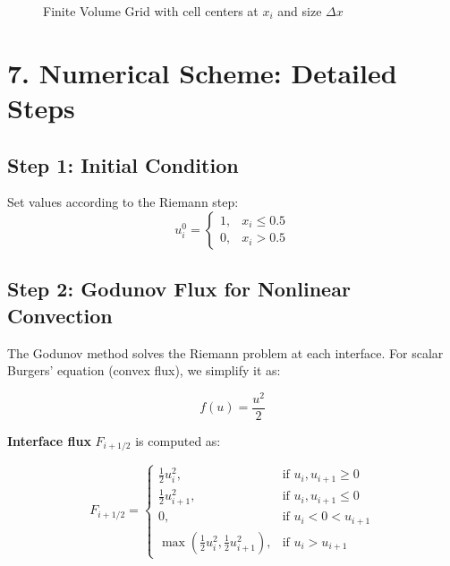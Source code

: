 \documentclass[12pt]{article}
\begin{document}
\begin{figure}[H]
\centering
{}
\caption{Finite Volume Grid with cell centers at $x_i$ and size $\Delta x$}
\end{figure}

\section*{7. Numerical Scheme: Detailed Steps}

\subsection*{Step 1: Initial Condition}
Set values according to the Riemann step:
\[
u^0_i =
\begin{cases}
1, & x_i \leq 0.5 \\
0, & x_i > 0.5
\end{cases}
\]

\subsection*{Step 2: Godunov Flux for Nonlinear Convection}
The Godunov method solves the Riemann problem at each interface. For scalar Burgers' equation (convex flux), we simplify it as:

\[
f(u) = \frac{u^2}{2}
\]

\textbf{Interface flux} \( F_{i+1/2} \) is computed as:

\[
F_{i+1/2} = 
\begin{cases}
\frac{1}{2} u_i^2, & \text{if } u_i, u_{i+1} \geq 0 \\
\frac{1}{2} u_{i+1}^2, & \text{if } u_i, u_{i+1} \leq 0 \\
0, & \text{if } u_i < 0 < u_{i+1} \\
\max\left( \frac{1}{2} u_i^2, \frac{1}{2} u_{i+1}^2 \right), & \text{if } u_i > u_{i+1}
\end{cases}
\]
\end{document}
